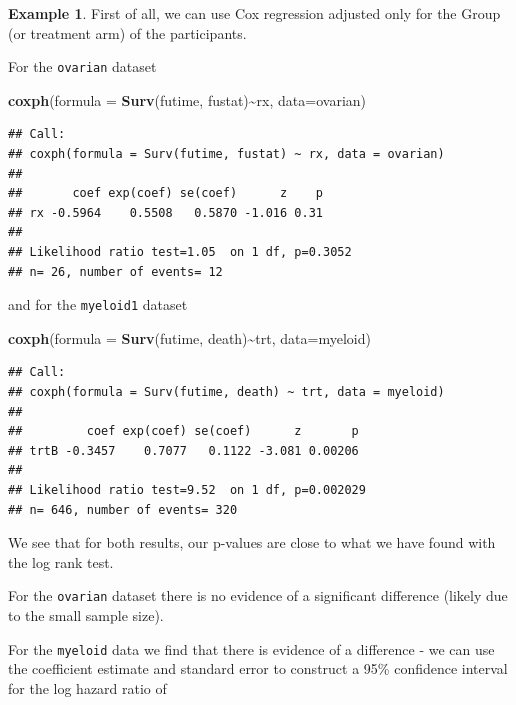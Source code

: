 \documentclass[
  openany]{book}
\newenvironment{Shaded}{\begin{snugshade}}{\end{snugshade}}
\newcommand{\AttributeTok}[1]{\textcolor[rgb]{0.13,0.29,0.53}{#1}}
\newcommand{\FunctionTok}[1]{\textcolor[rgb]{0.13,0.29,0.53}{\textbf{#1}}}
\newcommand{\NormalTok}[1]{#1}
\newcommand{\SpecialCharTok}[1]{\textcolor[rgb]{0.81,0.36,0.00}{\textbf{#1}}}
\theoremstyle{definition}
\theoremstyle{definition}
\newtheorem{example}{Example}[chapter]
\theoremstyle{definition}
\theoremstyle{definition}
\theoremstyle{remark}
\begin{document}
\begin{example}
First of all, we can use Cox regression adjusted only for the Group (or treatment arm) of the participants.

For the \texttt{ovarian} dataset

\begin{Shaded}
\begin{Highlighting}[]
\FunctionTok{coxph}\NormalTok{(}\AttributeTok{formula =} \FunctionTok{Surv}\NormalTok{(futime, fustat)}\SpecialCharTok{\textasciitilde{}}\NormalTok{rx, }\AttributeTok{data=}\NormalTok{ovarian)}
\end{Highlighting}
\end{Shaded}

\begin{verbatim}
## Call:
## coxph(formula = Surv(futime, fustat) ~ rx, data = ovarian)
## 
##       coef exp(coef) se(coef)      z    p
## rx -0.5964    0.5508   0.5870 -1.016 0.31
## 
## Likelihood ratio test=1.05  on 1 df, p=0.3052
## n= 26, number of events= 12
\end{verbatim}

and for the \texttt{myeloid1} dataset

\begin{Shaded}
\begin{Highlighting}[]
\FunctionTok{coxph}\NormalTok{(}\AttributeTok{formula =} \FunctionTok{Surv}\NormalTok{(futime, death)}\SpecialCharTok{\textasciitilde{}}\NormalTok{trt, }\AttributeTok{data=}\NormalTok{myeloid)}
\end{Highlighting}
\end{Shaded}

\begin{verbatim}
## Call:
## coxph(formula = Surv(futime, death) ~ trt, data = myeloid)
## 
##         coef exp(coef) se(coef)      z       p
## trtB -0.3457    0.7077   0.1122 -3.081 0.00206
## 
## Likelihood ratio test=9.52  on 1 df, p=0.002029
## n= 646, number of events= 320
\end{verbatim}

We see that for both results, our p-values are close to what we have found with the log rank test.

For the \texttt{ovarian} dataset there is no evidence of a significant difference (likely due to the small sample size).

For the \texttt{myeloid} data we find that there is evidence of a difference - we can use the coefficient estimate and standard error to construct a 95\% confidence interval for the log hazard ratio of


\end{example}
\end{document}
